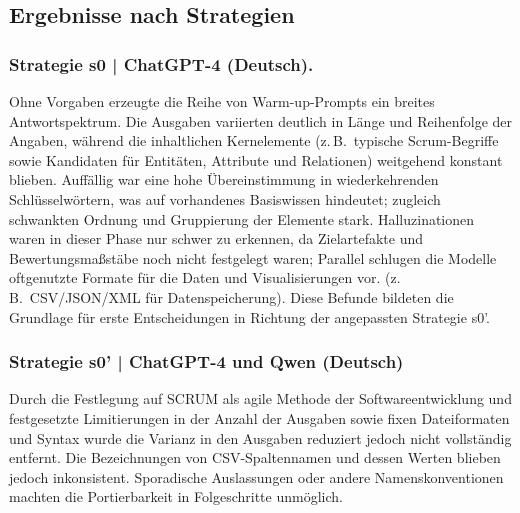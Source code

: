 \documentclass[runningheads]{llncs}
\begin{document}
\subsection{Ergebnisse nach Strategien}
\subsubsection{Strategie s0 | ChatGPT-4 (Deutsch).}
Ohne Vorgaben erzeugte die Reihe von Warm-up-Prompts ein breites Antwortspektrum. Die Ausgaben variierten deutlich in Länge und Reihenfolge der Angaben, während die inhaltlichen Kernelemente (z.\,B.\ typische Scrum-Begriffe sowie Kandidaten für Entitäten, Attribute und Relationen) weitgehend konstant blieben. Auffällig war eine hohe Übereinstimmung in wiederkehrenden Schlüsselwörtern, was auf vorhandenes Basiswissen hindeutet; zugleich schwankten Ordnung und Gruppierung der Elemente stark. Halluzinationen waren in dieser Phase nur schwer zu erkennen, da Zielartefakte und Bewertungsmaßstäbe noch nicht festgelegt waren; Parallel schlugen die Modelle oftgenutzte Formate für die Daten und Visualisierungen vor. (z.\,B.\ CSV/JSON/XML für Datenspeicherung). Diese Befunde bildeten die Grundlage für erste Entscheidungen in Richtung der  angepassten Strategie s0'.

\subsubsection{Strategie s0' | ChatGPT-4 und Qwen (Deutsch)}
Durch die Festlegung auf SCRUM als agile Methode der Softwareentwicklung und festgesetzte Limitierungen in der Anzahl der Ausgaben sowie fixen Dateiformaten und Syntax wurde die Varianz in den Ausgaben reduziert jedoch nicht vollständig entfernt. Die Bezeichnungen von CSV-Spaltennamen und dessen Werten blieben jedoch inkonsistent. Sporadische Auslassungen oder andere Namenskonventionen machten die Portierbarkeit in Folgeschritte unmöglich. 
\end{document}

